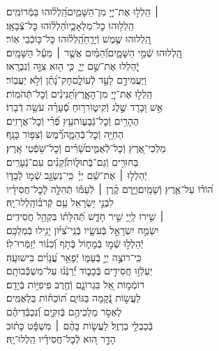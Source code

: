 \documentclass[twoside, openany, parskip=half, 11pt]{book}
\begin{document}
\begin{narrow}
 ׀ \hfill \break
הַֽלְל֣וּ אֶת־יְיָ֭ מִן־הַשָּׁמַ֑יִם\hfill הַֽ֝לְל֗וּהוּ בַּמְּֿרוֹמִֽים׃\\
הַֽלְל֥וּהוּ כׇל־מַלְאָכָ֑יו\hfill הַ֝לְל֗וּהוּ כׇּל־צְֿבָאָֽו׃\\
הַֽ֭לְלוּהוּ שֶׁ֣מֶשׁ וְֿיָרֵ֑חַ\hfill הַֽ֝לְל֗וּהוּ כׇּל־כּ֥וֹכְֿבֵי אֽוֹר׃\\
הַֽ֭לְלוּהוּ שְֿׁמֵ֣י הַשָּׁמָ֑יִם\hfill וְֿ֝הַמַּ֗יִם אֲשֶׁ֤ר ׀ מֵעַ֬ל הַשָּׁמָֽיִם׃\\
יְֽֿ֭הַלְלוּ אֶת־שֵׁ֣ם יְיָ֑\ כִּ֤י ה֖וּא צִוָּ֣ה וְֿנִבְרָֽאוּ׃\\
וַיַּעֲמִידֵ֣ם לָעַ֣ד לְֿעוֹלָ֑ם\hfill חׇק־נָ֝תַ֗ן וְֿלֹ֣א יַעֲבֽוֹר׃\\
הַֽלְל֣וּ אֶת־יְיָ֭ מִן־הָאָ֑רֶץ\hfill תַּ֝נִּינִ֗ים וְֿכׇל־תְּֿהֹמֽוֹת׃\\
אֵ֣שׁ וּ֭בָרָד שֶׁ֣לֶג וְֿקִיט֑וֹר\hfill ר֥וּחַ סְֿ֝עָרָ֗ה עֹשָׂ֥ה דְֿבָרֽוֹ׃\\
הֶהָרִ֥ים וְֿכׇל־גְּֿבָע֑וֹת\hfill עֵ֥ץ פְּֿ֝רִ֗י וְֿכׇל־אֲרָזִֽים׃\\
הַחַיָּ֥ה וְֿכׇל־בְּֿהֵמָ֑ה\hfill רֶ֗֝מֶשׂ וְֿצִפּ֥וֹר כָּנָֽף׃\\
מַלְכֵי־אֶ֭רֶץ וְֿכׇל־לְֿאֻמִּ֑ים\hfill שָׂ֝רִ֗ים וְֿכׇל־שֹׁ֥פְֿטֵי אָֽרֶץ׃\\
בַּחוּרִ֥ים וְֿגַם־בְּֿתוּל֑וֹת\hfill זְֿ֝קֵנִ֗ים עִם־נְֿעָרִֽים׃\\
יְֿהַלְל֤וּ ׀ אֶת־שֵׁ֬ם יְיָ֗\ כִּֽי־נִשְׂגָּ֣ב שְֿׁמ֣וֹ לְֿבַדּ֑וֹ\\
ה֝וֹד֗וֹ עַל־אֶ֥רֶץ וְֿשָׁמָֽיִם׃\hfill וַיָּ֤רֶם קֶ֨רֶן ׀ לְֿעַמּ֡וֹ תְּֿהִלָּ֤ה לְֽֿכׇל־חֲסִידָ֗יו\\
לִבְנֵ֣י יִ֭שְׂרָאֵל עַ֥ם קְֿרֹב֗וֹ\hfill הַֽלְלוּ־יָֽהּ׃\\
 ׀ \hfill \break
שִׁ֣ירוּ לַֽייָ֭ שִׁ֣יר חָדָ֑שׁ \hfill תְּֿ֝הִלָּת֗וֹ בִּקְהַ֥ל חֲסִידִֽים׃ \\
יִשְׂמַ֣ח יִשְׂרָאֵ֣ל בְּֿעֹשָׂ֑יו \hfill בְּֿנֵֽי־צִ֝יּ֗וֹן יָגִ֥ילוּ בְֿמַלְכָּֽם׃ \\
יְֿהַלְל֣וּ שְֿׁמ֣וֹ בְֿמָח֑וֹל \hfill בְּֿתֹ֥ף וְֿ֝כִנּ֗וֹר יְֿזַמְּֿרוּ־לֽוֹ׃ \\
כִּֽי־רוֹצֶ֣ה יְיָ֣ בְּֿעַמּ֑וֹ \hfill יְֿפָאֵ֥ר עֲ֝נָוִ֗ים בִּישׁוּעָֽה׃ \\
יַעְלְֿז֣וּ חֲסִידִ֣ים בְּֿכָב֑וֹד \hfill יְֿ֝רַנְּֿנ֗וּ עַל־מִשְׁכְּֿֿבוֹתָֽם׃ \\
רוֹמְֿמ֣וֹת אֵ֭ל בִּגְרוֹנָ֑ם \hfill וְֿחֶ֖רֶב פִּיפִיּ֣וֹת בְּֿיָדָֽם׃ \\
לַעֲשׂ֣וֹת נְֿ֭קָמָה בַּגּוֹיִ֑ם \hfill תּ֝וֹכֵח֗וֹת בַּלְאֻמִּֽים׃ \\
לֶאְסֹ֣ר מַלְכֵיהֶ֣ם בְּֿזִקִּ֑ים \hfill וְֿ֝נִכְבְּֿֿדֵיהֶ֗ם\\ בְּֿכַבְלֵ֥י בַרְזֶֽל׃ \hfill
לַעֲשׂ֤וֹת בָּהֶ֨ם ׀ מִשְׁפָּ֬ט כָּת֗וּב\\ הָדָ֣ר ה֭וּא לְֿכׇל־חֲסִידָ֗יו \hfill הַֽלְלוּ־יָֽהּ׃ \\


\end{narrow}
\end{document}
